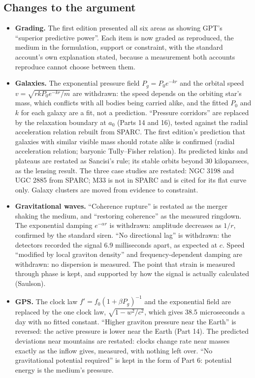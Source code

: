 \documentclass[11pt,a4paper]{article}
\begin{document}
\subsection*{Changes to the argument}
\begin{itemize}
\item \textbf{Grading.} The first edition presented all six areas as showing GPT's ``superior predictive power''. Each item is now graded as reproduced, the medium in the formulation, support or constraint, with the standard account's own explanation stated, because a measurement both accounts reproduce cannot choose between them.
\item \textbf{Galaxies.} The exponential pressure field $P_g = P_0e^{-kr}$ and the orbital speed $v = \sqrt{rkP_0e^{-kr}/m}$ are withdrawn: the speed depends on the orbiting star's mass, which conflicts with all bodies being carried alike, and the fitted $P_0$ and $k$ for each galaxy are a fit, not a prediction. ``Pressure corridors'' are replaced by the relaxation boundary at $a_0$ (Parts 14 and 16), tested against the radial acceleration relation rebuilt from SPARC. The first edition's prediction that galaxies with similar visible mass should rotate alike is confirmed (radial acceleration relation; baryonic Tully--Fisher relation). Its predicted kinks and plateaus are restated as Sancisi's rule; its stable orbits beyond 30 kiloparsecs, as the lensing result. The three case studies are restated: NGC 3198 and UGC 2885 from SPARC; M33 is not in SPARC and is cited for its flat curve only. Galaxy clusters are moved from evidence to constraint.
\item \textbf{Gravitational waves.} ``Coherence rupture'' is restated as the merger shaking the medium, and ``restoring coherence'' as the measured ringdown. The exponential damping $e^{-\alpha r}$ is withdrawn: amplitude decreases as $1/r$, confirmed by the standard siren. ``No directional lag'' is withdrawn: the detectors recorded the signal 6.9 milliseconds apart, as expected at $c$. Speed ``modified by local graviton density'' and frequency-dependent damping are withdrawn: no dispersion is measured. The point that strain is measured through phase is kept, and supported by how the signal is actually calculated (Saulson).
\item \textbf{GPS.} The clock law $f' = f_0(1+\beta P_g)^{-1}$ and the exponential field are replaced by the one clock law, $\sqrt{1-w^2/c^2}$, which gives 38.5 microseconds a day with no fitted constant. ``Higher graviton pressure near the Earth'' is reversed: the active pressure is lower near the Earth (Part 14). The predicted deviations near mountains are restated: clocks change rate near masses exactly as the inflow gives, measured, with nothing left over. ``No gravitational potential required'' is kept in the form of Part 6: potential energy is the medium's pressure.

\end{itemize}
\end{document}
